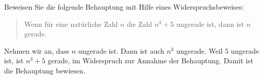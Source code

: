 Beweisen Sie die folgende Behauptung mit Hilfe eines Widerspruchsbeweises:
\begin{quote}
Wenn für eine natürliche Zahl $n$ die Zahl $n^3+5$ ungerade ist, dann ist
$n$ gerade.
\end{quote}

\begin{loesung}
Nehmen wir an, dass $n$ ungerade ist.
Dann ist auch $n^3$ ungerade.
Weil $5$ ungerade ist, ist $n^3+5$ gerade, im Widerspruch zur Annahme
der Behauptung.
Damit ist die Behauptung bewiesen.
\end{loesung}
